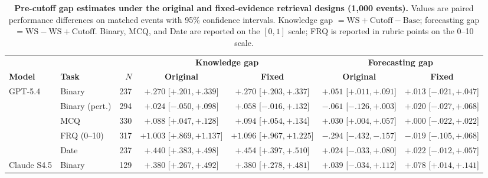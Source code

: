 \begin{table}[p]
\centering
\footnotesize

\caption{
\textbf{Pre-cutoff gap estimates under the original and fixed-evidence retrieval designs (1,000 events).}
Values are paired performance differences on matched events with 95\%
confidence intervals.
Knowledge gap $=\mathrm{WS+Cutoff}-\mathrm{Base}$;
forecasting gap $=\mathrm{WS}-\mathrm{WS+Cutoff}$.
Binary, MCQ, and Date are reported on the $[0,1]$ scale; FRQ is reported
in rubric points on the 0--10 scale.
}
\label{tab:gaps_pre}

\setlength{\tabcolsep}{4pt}
\renewcommand{\arraystretch}{1.12}

\begin{tabular}{l l r c c c c}
\toprule
& & & \multicolumn{2}{c}{\textbf{Knowledge gap}} & \multicolumn{2}{c}{\textbf{Forecasting gap}} \\
\cmidrule(lr){4-5}
\cmidrule(lr){6-7}
\textbf{Model} & \textbf{Task} & $N$ & \textbf{Original} & \textbf{Fixed} & \textbf{Original} & \textbf{Fixed} \\
\midrule

GPT-5.4
& Binary
& 237
& $+.270$ {\tiny[$+.201,+.339$]}
& $+.270$ {\tiny[$+.203,+.337$]}
& $+.051$ {\tiny[$+.011,+.091$]}
& $+.013$ {\tiny[$-.021,+.047$]} \\


& Binary (pert.)
& 294
& $+.024$ {\tiny[$-.050,+.098$]}
& $+.058$ {\tiny[$-.016,+.132$]}
& $-.061$ {\tiny[$-.126,+.003$]}
& $+.020$ {\tiny[$-.027,+.068$]} \\


& MCQ
& 330
& $+.088$ {\tiny[$+.047,+.128$]}
& $+.094$ {\tiny[$+.054,+.134$]}
& $+.030$ {\tiny[$+.004,+.057$]}
& $+.000$ {\tiny[$-.022,+.022$]} \\


& FRQ (0--10)
& 317
& $+1.003$ {\tiny[$+.869,+1.137$]}
& $+1.096$ {\tiny[$+.967,+1.225$]}
& $-.294$ {\tiny[$-.432,-.157$]}
& $-.019$ {\tiny[$-.105,+.068$]} \\


& Date
& 237
& $+.440$ {\tiny[$+.383,+.498$]}
& $+.454$ {\tiny[$+.397,+.510$]}
& $+.024$ {\tiny[$-.033,+.080$]}
& $+.022$ {\tiny[$-.012,+.057$]} \\

\addlinespace

Claude S4.5
& Binary
& 129
& $+.380$ {\tiny[$+.267,+.492$]}
& $+.380$ {\tiny[$+.278,+.481$]}
& $+.039$ {\tiny[$-.034,+.112$]}
& $+.078$ {\tiny[$+.014,+.141$]} \\



\end{tabular}
\end{table}
